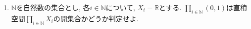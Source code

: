 \documentclass[dvipdfmx,a4paper,11pt]{article}
\newcommand{\R}{\mathbb{R}}
\newcommand{\N}{\mathbb{N}}
\theoremstyle{definition}
\begin{document}
\begin{enumerate}[ label=\textbf{問}\ref*{sec-product}.\arabic*]





\item $\N$を自然数の集合とし, 各$i \in \N$について, $X_{i} =\R $とする. %
$\prod_{i \in \N} (0,1)$は直積空間$\prod_{i \in \N} X_{i}$の開集合かどうか判定せよ.
	


\end{enumerate}
\end{document}
